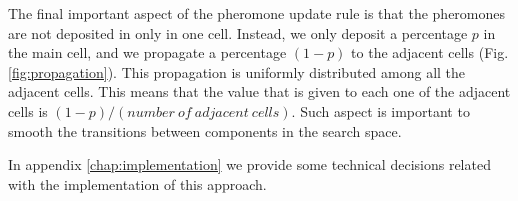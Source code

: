 			The final important aspect of the pheromone update rule is that the pheromones are not deposited in only in one cell. Instead, we only deposit a percentage $p$ in the main cell, and we propagate a percentage $(1-p)$ to the adjacent cells (Fig. \ref{fig:propagation}). This propagation is uniformly distributed among all the adjacent cells. This means that the value that is given to each one of the adjacent cells is $(1-p) / (number\ of\ adjacent\ cells)$. Such aspect is important to smooth the transitions between components in the search space.
			
			
		
		In appendix \ref{chap:implementation} we provide some technical decisions related with the implementation of this approach.
			
			
			
			
			